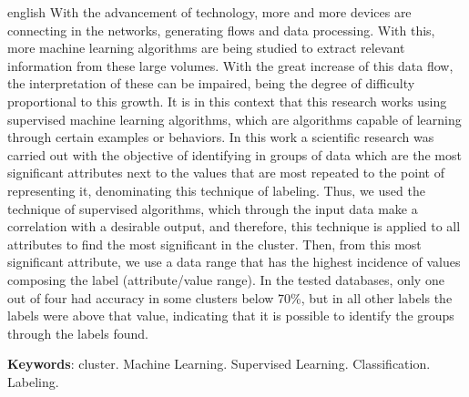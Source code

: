 \begin{resumo}[Abstract]
 \begin{otherlanguage*}{english}
With the advancement of technology, more and more devices are connecting in the networks, generating flows and data processing. With this, more machine learning algorithms are being studied to extract relevant information from these large volumes. With the great increase of this data flow, the interpretation of these can be impaired, being the degree of difficulty proportional to this growth. It is in this context that this research works using supervised machine learning algorithms, which are algorithms capable of learning through certain examples or behaviors. In this work a scientific research was carried out with the objective of identifying in groups of data which are the most significant attributes next to the values ​​that are most repeated to the point of representing it, denominating this technique of labeling. Thus, we used the technique of supervised algorithms, which through the input data make a correlation with a desirable output, and therefore, this technique is applied to all attributes to find the most significant in the cluster. Then, from this most significant attribute, we use a data range that has the highest incidence of values ​​composing the label (attribute/value range). In the tested databases, only one out of four had accuracy in some clusters below 70\%, but in all other labels the labels were above that value, indicating that it is possible to identify the groups through the labels found.
   
   
   \vspace{\onelineskip}
 
   \noindent 
   \textbf{Keywords}:  cluster. Machine Learning. Supervised Learning. Classification. Labeling.
 \end{otherlanguage*}
\end{resumo}
